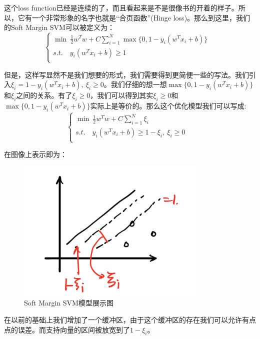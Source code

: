 \documentclass[a4paper]{article}
\begin{document}
这个loss function已经是连续的了，而且看起来是不是很像书的开着的样子。所以，它有一个非常形象的名字也就是“合页函数”(Hinge loss)。那么到这里，我们的Soft Margin SVM可以被定义为：
\begin{equation}
    \left\{
        \begin{array}{ll}
        \min \ \frac{1}{2}w^Tw + C\sum_{i=1}^N\max\{ 0, 1-y_i(w^Tx_i+b) \}  & \\
        s.t.\quad y_i(w^Tx_i + b) \geq 1 & \\
    \end{array}
    \right.
\end{equation}

但是，这样写显然不是我们想要的形式，我们需要得到更简便一些的写法。我们引入$\xi_i = 1-y_i(w^Tx_i+b), \ \xi_i \geq 0 $。我们仔细的想一想$\max\{ 0, 1-y_i(w^Tx_i+b) \}$和$\xi_i$之间的关系。有了$\xi_i \geq 0$，我们可以得到其实$\xi_i \geq 0$和$\max\{ 0, 1-y_i(w^Tx_i+b) \}$实际上是等价的。那么这个优化模型我们可以写成:
\begin{equation}
    \left\{
        \begin{array}{ll}
        \min \ \frac{1}{2}w^Tw + C\sum_{i=1}^N\xi_i  & \\
        s.t.\quad y_i(w^Tx_i + b) \geq 1 - \xi_i, \ \xi_i \geq 0 & \\
    \end{array}
    \right.
\end{equation}

在图像上表示即为：
\begin{figure}[H]
    \centering
    \includegraphics[width=.4\textwidth]{微信图片_20191115134816.png}
    \caption{Soft Margin SVM模型展示图}
    \label{fig:my_label_1}
\end{figure}

在以前的基础上我们增加了一个缓冲区，由于这个缓冲区的存在我们可以允许有点点的误差。而支持向量的区间被放宽到了$1-\xi_i$。
\end{document}
